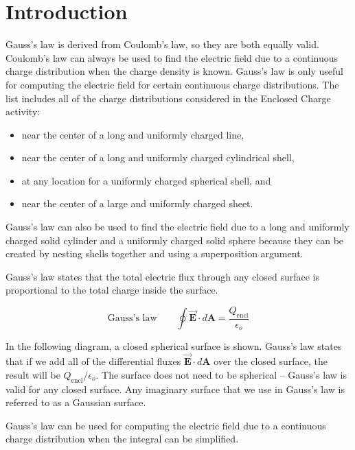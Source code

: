 \documentclass{article}
\newcommand{\bfvec}[1]{\vec{\mathbf{#1}}}
\begin{document}
\section{Introduction}

Gauss's law is derived from Coulomb's law, so they are both equally valid. Coulomb's law can always be used to find the electric field due to a continuous charge distribution when the charge density is known. Gauss's law is only useful for computing the electric field for certain continuous charge distributions. The list includes all of the charge distributions considered in the Enclosed Charge activity:

\begin{itemize}

  \item near the center of a long and uniformly charged line,

  \item near the center of a long and uniformly charged cylindrical shell,

  \item at any location for a uniformly charged spherical shell, and

  \item near the center of a large and uniformly charged sheet.

\end{itemize}

Gauss's law can also be used to find the electric field due to a long and uniformly charged solid cylinder and a uniformly charged solid sphere because they can be created by nesting shells together and using a superposition argument.

Gauss's law states that the total electric flux through any closed surface is proportional to the total charge inside the surface.

$$\text{Gauss's law}\qquad\oint \bfvec{E}\cdot d\mathbf{A}=\frac{Q_{\text{encl}}}{\epsilon_o}$$

In the following diagram, a closed spherical surface is shown. Gauss's law states that if we add all of the differential fluxes $\bfvec{E}\cdot d\mathbf{A}$ over the closed surface, the result will be ${Q_{\text{encl}}}/{\epsilon_o}$. The surface does not need to be spherical -- Gauss's law is valid for any closed surface. Any imaginary surface that we use in Gauss's law is referred to as a Gaussian surface.



Gauss's law can be used for computing the electric field due to a continuous charge distribution when the integral can be simplified.
\end{document}
